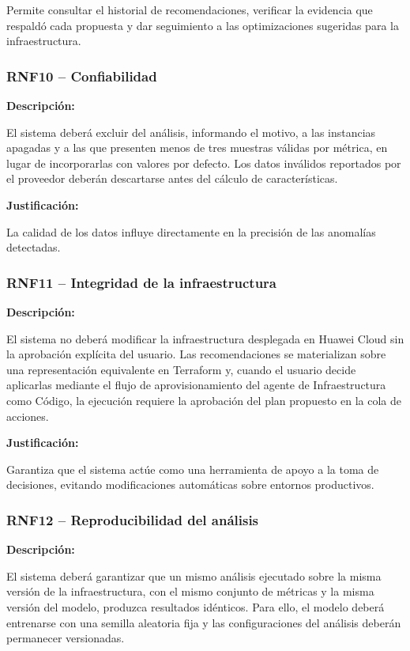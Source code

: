 Permite consultar el historial de recomendaciones, verificar la evidencia que respaldó cada propuesta y dar seguimiento a las optimizaciones sugeridas para la infraestructura.

\subsubsection{RNF10 -- Confiabilidad}

\noindent \textbf{Descripción:}

El sistema deberá excluir del análisis, informando el motivo, a las instancias apagadas y a las que presenten menos de tres muestras válidas por métrica, en lugar de incorporarlas con valores por defecto. Los datos inválidos reportados por el proveedor deberán descartarse antes del cálculo de características.

\noindent \textbf{Justificación:}

La calidad de los datos influye directamente en la precisión de las anomalías detectadas.

\subsubsection{RNF11 -- Integridad de la infraestructura}

\noindent \textbf{Descripción:}

El sistema no deberá modificar la infraestructura desplegada en Huawei Cloud sin la aprobación explícita del usuario. Las recomendaciones se materializan sobre una representación equivalente en Terraform y, cuando el usuario decide aplicarlas mediante el flujo de aprovisionamiento del agente de Infraestructura como Código, la ejecución requiere la aprobación del plan propuesto en la cola de acciones.

\noindent \textbf{Justificación:}

Garantiza que el sistema actúe como una herramienta de apoyo a la toma de decisiones, evitando modificaciones automáticas sobre entornos productivos.

\subsubsection{RNF12 -- Reproducibilidad del análisis}

\noindent \textbf{Descripción:}

El sistema deberá garantizar que un mismo análisis ejecutado sobre la misma versión de la infraestructura, con el mismo conjunto de métricas y la misma versión del modelo, produzca resultados idénticos. Para ello, el modelo deberá entrenarse con una semilla aleatoria fija y las configuraciones del análisis deberán permanecer versionadas.

